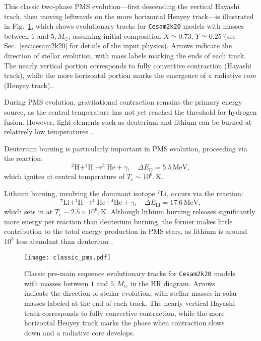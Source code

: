 \documentclass[12pt,a4paper]{article}
\newcommand{\mr}{\mathrm}
\begin{document}
This classic two-phase PMS evolution—first descending the vertical Hayashi track, then moving leftwards on the more horizontal Henyey track—is illustrated in Fig.~\ref{fig:hayashi_henyey_tracks}, which shows evolutionary tracks for \texttt{Cesam2k20} models with masses between $1$ and $5,M_\odot$, assuming initial composition $X \simeq 0.73$, $Y \simeq 0.25$ (see Sec.~\ref{sec:cesam2k20} for details of the input physics). Arrows indicate the direction of stellar evolution, with mass labels marking the ends of each track. The nearly vertical portion corresponds to fully convective contraction (Hayashi track), while the more horizontal portion marks the emergence of a radiative core (Henyey track)..

During PMS evolution, gravitational contraction remains the primary energy source, as the central temperature has not yet reached the threshold for hydrogen fusion. However, light elements such as deuterium and lithium can be burned at relatively low temperatures \parencite{KippenhahnEtAl2013}.

Deuterium burning is particularly important in PMS evolution, proceeding via the reaction:
\begin{equation}
  ^2\mr{H} + ^1\mr{H} \rightarrow ^3\mr{He} + \gamma,\quad \Delta E_\mr{D} = 5.5\,\mr{MeV},
\end{equation}
which ignites at central temperature of $T_c \sim 10^6,\mr{K}$. 

Lithium burning, involving the dominant isotope $^7$Li, occurs via the reaction:
\begin{equation}
  ^7\mr{Li} + ^1\mr{H} \rightarrow ^4\mr{He} + ^4\mr{He} + \gamma,\quad \Delta E_\mr{Li} = 17.6\,\mr{MeV},
\end{equation}
which sets in at $T_c \sim 2.5 \times 10^6,\mr{K}$. Although lithium burning releases significantly more energy per reaction than deuterium burning, the former makes little contribution to the total energy production in PMS stars, as lithium is around $10^3$ less abundant than deuterium \parencite{GrevesseSauval1998}.

\begin{figure}[htbp]
  \centering
  \texttt{[image: classic\_pms.pdf]}
  \caption{Classic pre-main sequence evolutionary tracks for \texttt{Cesam2k20} models with masses between $1$ and $5,M_\odot$ in the HR diagram. Arrows indicate the direction of stellar evolution, with stellar masses in solar masses labeled at the end of each track. The nearly vertical Hayashi track corresponds to fully convective contraction, while the more horizontal Henyey track marks the phase when contraction slows down and a radiative core develops.} \label{fig:hayashi_henyey_tracks}
\end{figure}
\end{document}
